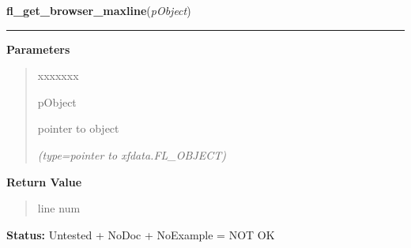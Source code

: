 \hspace{.8\funcindent}\begin{boxedminipage}{\funcwidth}

    \raggedright \textbf{fl\_get\_browser\_maxline}(\textit{pObject})

    \vspace{-1.5ex}

    \rule{\textwidth}{0.5\fboxrule}
\setlength{\parskip}{2ex}
\setlength{\parskip}{1ex}
      \textbf{Parameters}
      \vspace{-1ex}

      \begin{quote}
        \begin{Ventry}{xxxxxxx}

          \item[pObject]

          pointer to object

            {\it (type=pointer to xfdata.FL\_OBJECT)}

        \end{Ventry}

      \end{quote}

      \textbf{Return Value}
    \vspace{-1ex}

      \begin{quote}
      line num

      \end{quote}

\textbf{Status:} Untested + NoDoc + NoExample = NOT OK



    \end{boxedminipage}

    \label{xformslib:library:fl_get_browser_screenlines}

    \vspace{0.5ex}


